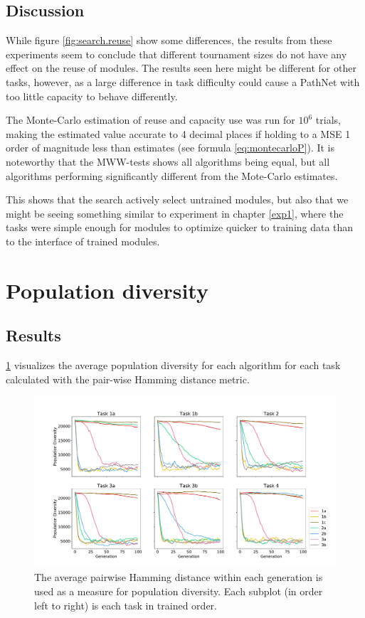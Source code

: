 \subsection{Discussion}
While figure \ref{fig:search.reuse} show some differences, the results from these experiments seem to conclude that different tournament sizes do not have any effect on the reuse of modules. The results seen here might be different for other tasks, however, as a large difference in task difficulty could cause a PathNet with too little capacity to behave differently.

The Monte-Carlo estimation of reuse and capacity use was run for \(10^{6}\) trials, making the estimated value accurate to 4 decimal places if holding to a MSE 1 order of magnitude less than estimates (see formula \ref{eq:montecarloP}). It is noteworthy that the MWW-tests shows all algorithms being equal, but all algorithms performing significantly different from the Mote-Carlo estimates. 

This shows that the search actively select untrained modules, but also that we might be seeing something similar to experiment in chapter \ref{exp1}, where the tasks were simple enough for modules to optimize quicker to training data than to the interface of trained modules.

\section{Population diversity}
\label{exp2:diversity}
\subsection{Results}
\ref{fig:search.hamming_diversity} visualizes the average population diversity for each algorithm for each task calculated with the pair-wise Hamming distance metric. 

\begin{figure}
    \includegraphics[width=1.2\textwidth,center]{Chapters/4.Experiments/exp2/figures/inuse/Average_population_diversity_reduced_hamming.pdf}
    \caption[Pair-wise Hamming distance diversity]{The average pairwise Hamming distance within each generation is used as a measure for population diversity. Each subplot (in order left to right) is each task in trained order.}
    \label{fig:search.hamming_diversity}
\end{figure}

